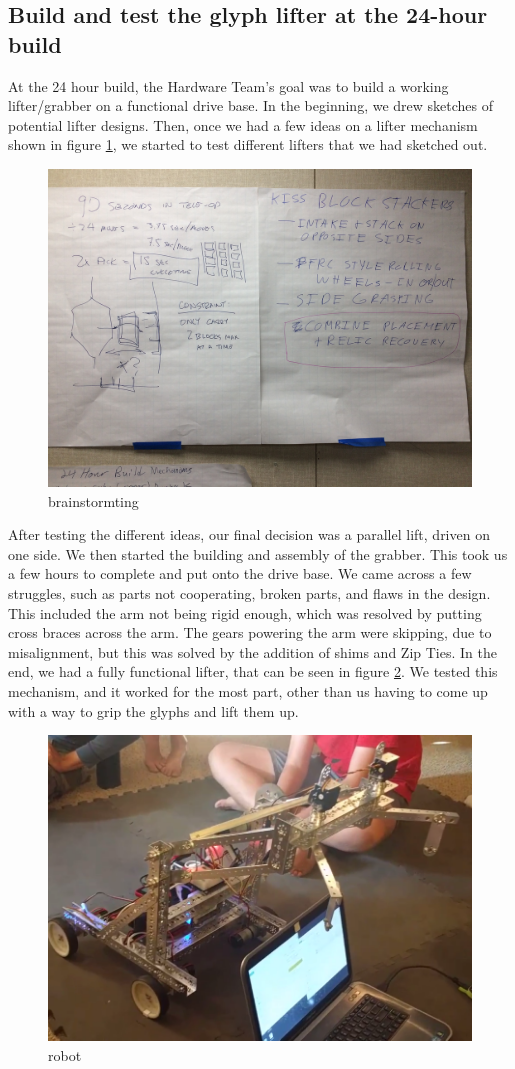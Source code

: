 \documentclass{article}
\begin{document}
\subsection{Build and test the glyph lifter at the 24-hour build}
At the 24 hour build, the Hardware Team's goal was to build a working lifter/grabber on a functional drive base. In the beginning, we drew sketches of potential lifter designs. Then, once we had a few ideas on a lifter mechanism shown in figure \ref{fig:brainstorm}, we started to test different lifters that we had sketched out. 
\begin{figure}[h]
    \centering
    \includegraphics[width=.8\textwidth]{01/images/brainstorm.jpg}
    \caption{brainstormting}
    \label{fig:brainstorm}
\end{figure}
After testing the different ideas, our final decision was a parallel lift, driven on one side. We then started the building and assembly of the grabber. This took us a few hours to complete and put onto the drive base. We came across a few struggles, such as parts not cooperating, broken parts, and flaws in the design. This included the arm not being rigid enough, which was resolved by putting cross braces across the arm. The gears powering the arm were skipping, due to misalignment, but this was solved by the addition of shims and Zip Ties. In the end, we had a fully functional lifter, that can be seen in figure \ref{fig:robot}. We tested this mechanism, and it worked for the most part, other than us having to come up with a way to grip the glyphs and lift them up. 
\begin{figure}[h]
    \centering
    \includegraphics[width=.6\textwidth]{01/images/robot.png}
    \caption{robot}
    \label{fig:robot}
\end{figure}
\end{document}
